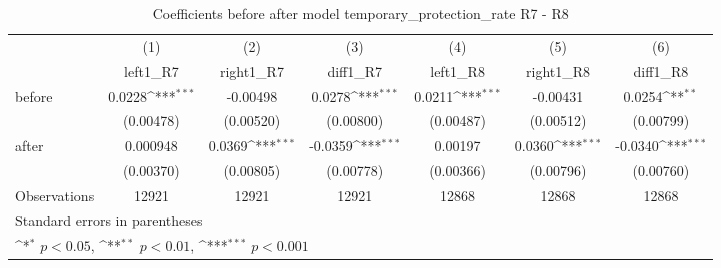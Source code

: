 \begin{table}[htbp]\centering
\def\sym#1{\ifmmode^{#1}\else\(^{#1}\)\fi}
\caption{Coefficients before after model temporary\_protection\_rate R7 - R8}
\begin{tabular}{l*{6}{c}}
\hline\hline
                    &\multicolumn{1}{c}{(1)}&\multicolumn{1}{c}{(2)}&\multicolumn{1}{c}{(3)}&\multicolumn{1}{c}{(4)}&\multicolumn{1}{c}{(5)}&\multicolumn{1}{c}{(6)}\\
                    &\multicolumn{1}{c}{left1\_R7}&\multicolumn{1}{c}{right1\_R7}&\multicolumn{1}{c}{diff1\_R7}&\multicolumn{1}{c}{left1\_R8}&\multicolumn{1}{c}{right1\_R8}&\multicolumn{1}{c}{diff1\_R8}\\
\hline
before              &      0.0228\sym{***}&    -0.00498         &      0.0278\sym{***}&      0.0211\sym{***}&    -0.00431         &      0.0254\sym{**} \\
                    &   (0.00478)         &   (0.00520)         &   (0.00800)         &   (0.00487)         &   (0.00512)         &   (0.00799)         \\
[1em]
after               &    0.000948         &      0.0369\sym{***}&     -0.0359\sym{***}&     0.00197         &      0.0360\sym{***}&     -0.0340\sym{***}\\
                    &   (0.00370)         &   (0.00805)         &   (0.00778)         &   (0.00366)         &   (0.00796)         &   (0.00760)         \\
\hline
Observations        &       12921         &       12921         &       12921         &       12868         &       12868         &       12868         \\
\hline\hline
\multicolumn{7}{l}{\footnotesize Standard errors in parentheses}\\
\multicolumn{7}{l}{\footnotesize \sym{*} \(p<0.05\), \sym{**} \(p<0.01\), \sym{***} \(p<0.001\)}\\
\end{tabular}
\end{table}
